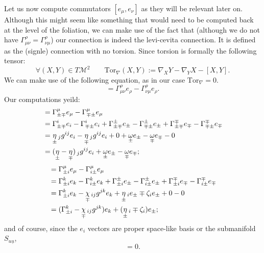 \documentclass[a4paper,11pt]{article}
\numberwithin{equation}{section}
\theoremstyle{definition}
\begin{document}
Let us now compute commutators $[e_\mu,e_\nu]$ as they will be relevant later on. Although this might seem like something that would need to be computed back at the level of the foliation, we can make use of the fact that (although we do not have $\Gamma_{\mu\nu}^\rho=\Gamma_{\nu\mu}^\rho$) our connection is indeed the levi-cevita connection. It is defined as the (signle) connection with no torsion. Since torsion is formally the following tensor:
\begin{equation}
\forall (X,Y) \in T\mathcal{M}^2 \quad\quad  \mathrm{Tor}_\nabla(X,Y):= \nabla_XY-\nabla_YX-[X,Y].
\end{equation}
We can make use of the following equation, as in our case $\mathrm{Tor}_\nabla=0$.
\begin{equation}
    [e_\mu,e_\nu]=\Gamma_{\mu\nu}^\rho e_\rho-\Gamma_{\nu\mu}^\rho e_\rho.
\end{equation}
Our computations yeild:
\begin{align}
    [e_\pm,e_\mp]&=\Gamma_{\pm\mp}^\mu e_\mu - \Gamma_{\mp\pm}^\mu e_\mu\notag\\
    &=\Gamma_{\pm\mp}^i e_i - \Gamma_{\mp\pm}^i e_i + \Gamma_{\pm\mp}^\pm e_\pm - \Gamma_{\mp\pm}^\pm e_\pm + \Gamma_{\pm\mp}^\mp e_\mp - \Gamma_{\mp\pm}^\mp e_\mp\notag\\
    &=\underset{\pm}{\eta}\,_jg^{ij} e_i - \underset{\mp}{\eta}\,_jg^{ij} e_i + 0 + \underset{\pm}{\omega} e_\pm - \underset{\mp}{\omega} e_\mp - 0\notag\\
    &=(\underset{\pm}{\eta}-\underset{\mp}{\eta})\,_jg^{ij} e_i+ \underset{\pm}{\omega} e_\pm - \underset{\mp}{\omega} e_\mp\label{[pm,mp]};
\end{align}
\begin{align}
    [e_\pm,e_i]&=\Gamma_{\pm i}^\mu e_\mu - \Gamma_{i\pm}^\mu e_\mu\notag\\
    &=\Gamma_{\pm i}^k e_k - \Gamma_{i\pm}^k e_k + \Gamma_{\pm i}^\pm e_\pm - \Gamma_{i\pm}^\pm e_\pm + \Gamma_{\pm i}^\mp e_\mp - \Gamma_{i\pm}^\mp e_\mp\notag\\
    &=\Gamma_{\pm i}^k e_k - \underset{\mp}{\chi}\,_{ij}g^{jk} e_k + \underset{\pm}{\eta}\,_i e_\pm \mp \zeta_i e_\pm + 0 - 0\notag\\
    &=(\Gamma_{\pm i}^k - \underset{\mp}{\chi}\,_{ij}g^{jk}) e_k + (\underset{\pm}{\eta}\,_i \mp \zeta_i) e_\pm \label{[pm,i]};
\end{align}
and of course, since the $e_i$ vectors are proper space-like basis or the submanifold $S_{u\underline{u}}$, 
\begin{equation}[e_i,e_j]=0 \label{[i,j]}.\end{equation}
\end{document}
